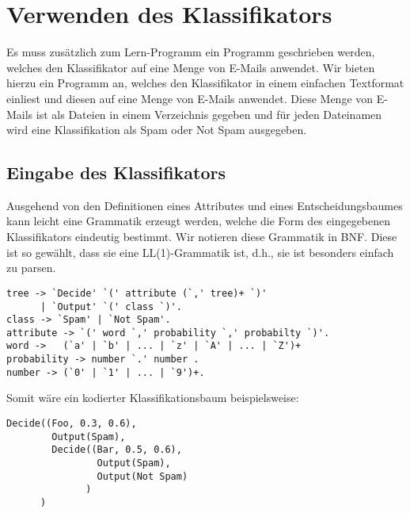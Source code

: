 \documentclass{article}
\begin{document}
\pagebreak  %
\section{Verwenden des Klassifikators}
Es muss zus\"atzlich zum Lern-Programm ein Programm geschrieben
werden, welches den Klassifikator auf eine Menge von E-Mails anwendet.
Wir bieten hierzu ein Programm an, welches den Klassifikator in einem
einfachen Textformat einliest und diesen auf eine Menge von E-Mails
anwendet. Diese Menge von E-Mails ist als Dateien in einem Verzeichnis
gegeben und f\"ur jeden Dateinamen wird eine Klassifikation als Spam
oder Not Spam ausgegeben.
\subsection{Eingabe des Klassifikators}
Ausgehend von den Definitionen eines Attributes und eines Entscheidungsbaumes
kann leicht eine Grammatik erzeugt werden, welche die Form des eingegebenen
Klassifikators eindeutig bestimmt. Wir notieren diese Grammatik in BNF. Diese
ist so gew\"ahlt, dass sie eine LL(1)-Grammatik ist, d.h., sie ist besonders
einfach zu parsen.\\
\begin{verbatim}
tree -> `Decide' `(' attribute (`,' tree)+ `)'
      | `Output' `(' class `)'.
class -> `Spam' | `Not Spam'.
attribute -> `(' word `,' probability `,' probabilty `)'.
word ->   (`a' | `b' | ... | `z' | `A' | ... | `Z')+
probability -> number `.' number .
number -> (`0' | `1' | ... | `9')+.
\end{verbatim}

Somit w\"are ein kodierter Klassifikationsbaum beispielsweise:
\begin{verbatim}
Decide((Foo, 0.3, 0.6),
        Output(Spam), 
        Decide((Bar, 0.5, 0.6), 
                Output(Spam), 
                Output(Not Spam)
              )
      )
\end{verbatim}
\end{document}
